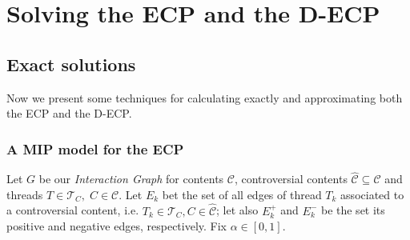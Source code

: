 \chapter{Solving the \acrshort{ECP} and the \acrshort{D-ECP}}
\label{ch:solving}





\section{Exact solutions}%
\label{sec:exact-solutions}

Now we present some techniques for calculating exactly and approximating both
the \acrshort{ECP} and the \acrshort{D-ECP}.

\subsection{A MIP model for the \acrshort{ECP}}%
\label{sub:a_mip_model_for_the_ecp}

Let $G$ be our \emph{Interaction Graph} for contents $\mathcal{C} $,
controversial contents $\mathcal{\hat{C}} \subseteq \mathcal{C} $ and
threads $T \in \mathcal{T}_{C}, \; C \in \mathcal{C} $. Let $E_k$ bet the set
of all edges of thread $T_k$ associated to a controversial content, i.e. $T_{k}
	\in \mathcal{T}_{C}, C \in \mathcal{\hat{C}}$; let also $E^{+}_k $
and $E^{-}_k $ be the set its positive and negative edges, respectively. Fix $\alpha \in [0, 1]$.

